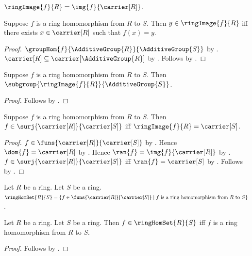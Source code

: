 \begin{definition}\label{ring_image}
    $\ringImage{f}{R}=\img{f}{\carrier[R]}$.
\end{definition}

\begin{proposition}\label{ring_image_iff}
    Suppose $f$ is a ring homomorphism from $R$ to $S$.
    Then $y\in\ringImage{f}{R}$ iff
        there exists $x\in\carrier[R]$ such that $f(x)=y$.
\end{proposition}
\begin{proof}
    $\groupHom{f}{\AdditiveGroup{R}}{\AdditiveGroup{S}}$ by
        .
    $\carrier[R]\subseteq\carrier[\AdditiveGroup{R}]$ by
        .
    Follows by
        .
\end{proof}

\begin{theorem}\label{ring_image_is_additive_subgroup}
    Suppose $f$ is a ring homomorphism from $R$ to $S$.
    Then $\subgroup{\ringImage{f}{R}}{\AdditiveGroup{S}}$.
\end{theorem}
\begin{proof}
    Follows by
        .
\end{proof}

\begin{theorem}\label{ring_hom_surjective_iff_image_full}
    Suppose $f$ is a ring homomorphism from $R$ to $S$.
    Then $f\in\surj{\carrier[R]}{\carrier[S]}$ iff
        $\ringImage{f}{R}=\carrier[S]$.
\end{theorem}
\begin{proof}
    $f\in\funs{\carrier[R]}{\carrier[S]}$ by .
    Hence $\dom{f}=\carrier[R]$ by .
    Hence $\ran{f}=\img{f}{\carrier[R]}$ by .
    $f\in\surj{\carrier[R]}{\carrier[S]}$ iff
        $\ran{f}=\carrier[S]$ by .
    Follows by .
\end{proof}

\begin{definition}\label{ring_hom_set}
    Let $R$ be a ring.
    Let $S$ be a ring.
    $\ringHomSet{R}{S}=
        \{f\in\funs{\carrier[R]}{\carrier[S]}\mid
            \text{$f$ is a ring homomorphism from $R$ to $S$}\}$.
\end{definition}

\begin{proposition}\label{ring_hom_set_iff}
    Let $R$ be a ring.
    Let $S$ be a ring.
    Then $f\in\ringHomSet{R}{S}$ iff
        $f$ is a ring homomorphism from $R$ to $S$.
\end{proposition}
\begin{proof}
    Follows by .
\end{proof}

